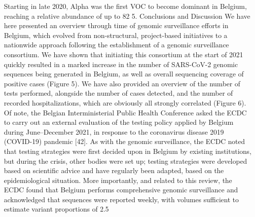 Starting in late 2020, Alpha was the first VOC to become dominant in Belgium, reaching a relative abundance of up to 82%
5. Conclusions and Discussion
We have here presented an overview through time of genomic surveillance efforts in Belgium, which evolved from non-structural, project-based initiatives to a nationwide approach following the establishment of a genomic surveillance consortium. We have shown that initiating this consortium at the start of 2021 quickly resulted in a marked increase in the number of SARS-CoV-2 genomic sequences being generated in Belgium, as well as overall sequencing coverage of positive cases (Figure 5). We have also provided an overview of the number of tests performed, alongside the number of cases detected, and the number of recorded hospitalizations, which are obviously all strongly correlated (Figure 6). Of note, the Belgian Interministerial Public Health Conference asked the ECDC to carry out an external evaluation of the testing policy applied by Belgium during June–December 2021, in response to the coronavirus disease 2019 (COVID-19) pandemic [42]. As with the genomic surveillance, the ECDC noted that testing strategies were first decided upon in Belgium by existing institutions, but during the crisis, other bodies were set up; testing strategies were developed based on scientific advice and have regularly been adapted, based on the epidemiological situation. More importantly, and related to this review, the ECDC found that Belgium performs comprehensive genomic surveillance and acknowledged that sequences were reported weekly, with volumes sufficient to estimate variant proportions of 2.5%
